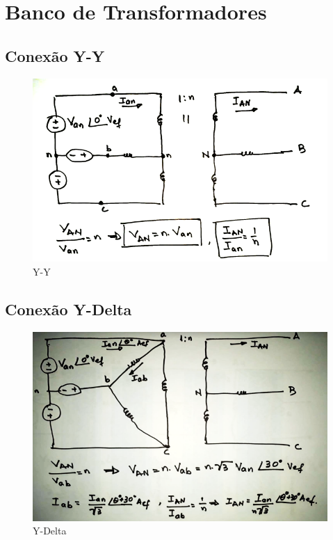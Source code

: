 \documentclass[a4paper, 12pt]{article}
\begin{document}
\section{Banco de Transformadores}
	\subsection{Conexão Y-Y}
		\begin{figure}[h]
			\centering
			\includegraphics[scale=0.6]{a19.png}
			\caption{Y-Y}
		\end{figure}

	\subsection{Conexão Y-Delta}
		\begin{figure}[h]
			\centering
			\includegraphics[scale=0.6]{a20.png}
			\caption{Y-Delta}
		\end{figure}
\end{document}
